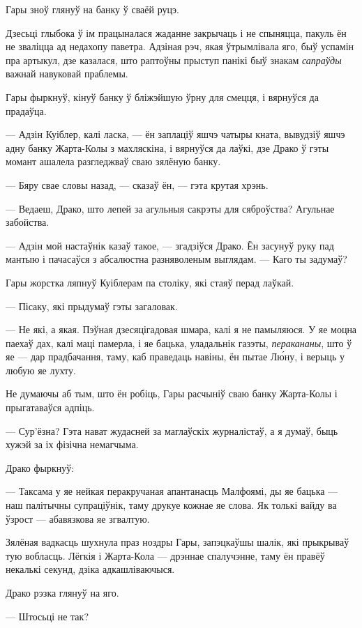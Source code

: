 Гары зноў глянуў на банку ў сваёй руцэ.

Дзесьці глыбока ў ім працыналася жаданне закрычаць і не спыняцца, пакуль ён не 
зваліцца ад недахопу паветра. Адзіная рэч, якая ўтрымлівала яго, быў успамін 
пра артыкул, дзе казалася, што раптоўны прыступ панікі быў знакам   
\emph{сапраўды} важнай навуковай праблемы.

Гары фыркнуў, кінуў банку ў бліжэйшую ўрну для смецця, і вярнуўся да прадаўца.

--- Адзін Куіблер, калі ласка, --- ён заплаціў яшчэ чатыры кната, вывудзіў
яшчэ адну банку Жарта-Колы з махляскіна, і вярнуўся да лаўкі, дзе Драко ў гэты
момант ашалела разгледжваў сваю зялёную банку.

--- Бяру свае словы назад, --- сказаў ён, --- гэта крутая хрэнь.

--- Ведаеш, Драко, што лепей за агульныя сакрэты для сяброўства? Агульнае забойства.

--- Адзін мой настаўнік казаў такое, --- згадзіўся Драко. Ён засунуў руку 
пад мантыю і пачасаўся з 
абсалюстна разняволеным выглядам. --- Каго ты задумаў?

Гары жорстка ляпнуў Куіблерам па століку, які стаяў перад лаўкай. 

--- Пісаку, які прыдумаў гэты загаловак.

--- Не які, а якая. Пэўная дзесяцігадовая шмара, калі я не памыляюся. У яе 
моцна паехаў дах, калі маці памерла, і яе бацька, уладальнік газэты,
\emph{перакананы}, што ў яе --- дар прадбачання, таму, каб праведаць навіны,
ён пытае Л\'юну, і верыць у любую яе лухту. 

Не думаючы аб тым, што ён робіць, Гары расчыніў сваю банку Жарта-Колы і 
прыгатаваўся адпіць. 

--- Сур'ёзна? Гэта нават жудасней за маглаўскіх журналістаў, а я думаў, быць хужэй
за іх фізічна немагчыма.

Драко фыркнуў:

--- Таксама у яе нейкая перакручаная апантанасць Малфоямі, ды яе бацька ---
наш палітычны супраціўнік, таму друкуе кожнае яе слова. Як толькі вайду ва ўзрост ---
абавязкова яе згвалтую.

Зялёная вадкасць шухнула праз ноздры Гары, запэцкаўшы шалік, які прыкрываў тую
вобласць. Лёгкія і Жарта-Кола --- дрэннае спалучэнне, таму ён 
правёў некалькі секунд, дзіка адкашліваючыся.

Драко рэзка глянуў на яго.

--- Штосьці не так?

